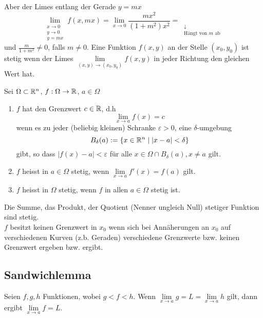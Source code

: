 Aber der Limes entlang der Gerade $y=mx$
\[\mathop {\lim }\limits_{\begin{array}{*{20}{c}}
{x \to 0}\\
{y \to 0}\\
{y = mx}
\end{array}} f(x,mx) = \mathop {\lim }\limits_{x \to 0} \frac{{m{x^2}}}{{(1 + {m^2}){x^2}}} = \mathop {\frac{m}{{1 + {m^2}}}}\limits_{\begin{array}{*{20}{c}}
 \downarrow \\
{{\text{Hängt von }} m {\text{ ab}}}
\end{array}} \]
und $\frac{m}{1+m^2}\not=0$, falls $m\not=0$. Eine Funktion $f(x,y)$ an der Stelle $(x_0,y_0)$ ist stetig wenn der Limes $\mathop {\lim }\limits_{(x,y) \to ({x_0},{y_0})} f(x,y)$ in jeder Richtung den gleichen Wert hat.
\begin{definition}{8.1}
Sei $\Omega\subset\mathbb{R}^n$, $f:\Omega \to\mathbb{R}$, $a\in\Omega$
\begin{enumerate}
\item $f$ hat den Grenzwert $c\in\mathbb{R}$, d.h \[\lim\limits_{x\to a} f(x)=c\] wenn es zu jeder (beliebig kleinen) Schranke $\varepsilon>0$, eine $\delta$-umgebung \[{B_\delta }(a): = \left\{ {x \in \mathbb{R}^n}\mid\left| {x - a} \right| < \delta  \right\}\] gibt, so dass $\left| {f(x) - a} \right| < \varepsilon$ für alle $x\in\Omega\cap B_\delta (a), x\not=a$ gilt.
\item $f$ heisst in $a\in\Omega$ stetig, wenn $\mathop {\lim }\limits_{x \to a} f'(x) = f(a)$ gilt.
\item $f$ heisst in $\Omega$ stetig, wenn $f$ in allen $a\in\Omega$ stetig ist.
\end{enumerate}
Die Summe, das Produkt, der Quotient (Nenner ungleich Null) stetiger Funktion sind stetig.\\

$f$ besitzt keinen Grenzwert in $x_0$ wenn sich bei Annäherungen an $x_0$ auf verschiedenen Kurven (z.b. Geraden) verschiedene Grenzwerte bzw. keinen Grenzwert ergeben bzw. ergibt.
\end{definition}

\subsection*{Sandwichlemma}
Seien $f,g,h$ Funktionen, wobei $g<f<h$. Wenn $\mathop {\lim }\limits_{x \to a} g = L = \mathop {\lim }\limits_{x \to a} h$ gilt, dann ergibt $\lim\limits_{x\to a}f=L$.\\

